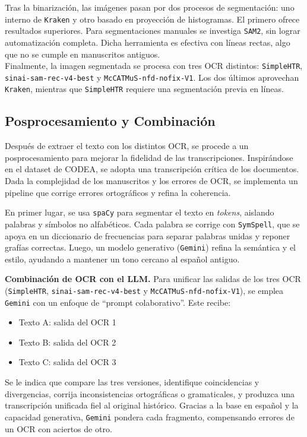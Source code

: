\documentclass[11pt,a4paper]{article}
\begin{document}
Tras la binarización, las imágenes pasan por dos procesos de segmentación: uno interno de \texttt{Kraken} y otro basado en proyección de histogramas. El primero ofrece resultados superiores. Para segmentaciones manuales se investiga \texttt{SAM2}, sin lograr automatización completa. Dicha herramienta es efectiva con líneas rectas, algo que no se cumple en manuscritos antiguos.\\

Finalmente, la imagen segmentada se procesa con tres OCR distintos: \texttt{SimpleHTR}, \texttt{sinai-sam-rec-v4-best} y \texttt{McCATMuS-nfd-nofix-V1}. Los dos últimos aprovechan \texttt{Kraken}, mientras que \texttt{SimpleHTR} requiere una segmentación previa en líneas.

\subsection{Posprocesamiento y Combinación}

Después de extraer el texto con los distintos OCR, se procede a un posprocesamiento para mejorar la fidelidad de las transcripciones. Inspirándose en el dataset de CODEA, se adopta una transcripción crítica de los documentos. Dada la complejidad de los manuscritos y los errores de OCR, se implementa un pipeline que corrige errores ortográficos y refina la coherencia.

En primer lugar, se usa \texttt{spaCy} para segmentar el texto en \textit{tokens}, aislando palabras y símbolos no alfabéticos. Cada palabra se corrige con \texttt{SymSpell}, que se apoya en un diccionario de frecuencias para separar palabras unidas y reponer grafías correctas. Luego, un modelo generativo (\texttt{Gemini}) refina la semántica y el estilo, ayudando a mantener un tono cercano al español antiguo.

\textbf{Combinación de OCR con el LLM.}  
Para unificar las salidas de los tres OCR (\texttt{SimpleHTR}, \texttt{sinai-sam-rec-v4-best} y \texttt{McCATMuS-nfd-nofix-V1}), se emplea \texttt{Gemini} con un enfoque de “prompt colaborativo”. Este recibe:

\begin{itemize}
\item Texto A: salida del OCR 1  
\item Texto B: salida del OCR 2  
\item Texto C: salida del OCR 3
\end{itemize}

Se le indica que compare las tres versiones, identifique coincidencias y divergencias, corrija inconsistencias ortográficas o gramaticales, y produzca una transcripción unificada fiel al original histórico. Gracias a la base en español y la capacidad generativa, \texttt{Gemini} pondera cada fragmento, compensando errores de un OCR con aciertos de otro.
\end{document}
